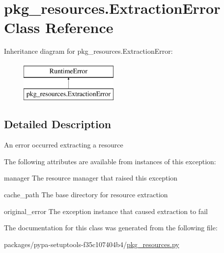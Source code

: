 \hypertarget{classpkg__resources_1_1ExtractionError}{}\section{pkg\+\_\+resources.\+Extraction\+Error Class Reference}
\label{classpkg__resources_1_1ExtractionError}
Inheritance diagram for pkg\+\_\+resources.\+Extraction\+Error\+:\begin{figure}[H]
\begin{center}
\leavevmode
\includegraphics[height=2.000000cm]{classpkg__resources_1_1ExtractionError}
\end{center}
\end{figure}


\subsection{Detailed Description}
\begin{DoxyVerb}An error occurred extracting a resource

The following attributes are available from instances of this exception:

manager
    The resource manager that raised this exception

cache_path
    The base directory for resource extraction

original_error
    The exception instance that caused extraction to fail
\end{DoxyVerb}
 

The documentation for this class was generated from the following file\+:\begin{DoxyCompactItemize}
\item 
packages/pypa-\/setuptools-\/f35c107404b4/\hyperlink{pkg__resources_8py}{pkg\+\_\+resources.\+py}\end{DoxyCompactItemize}

